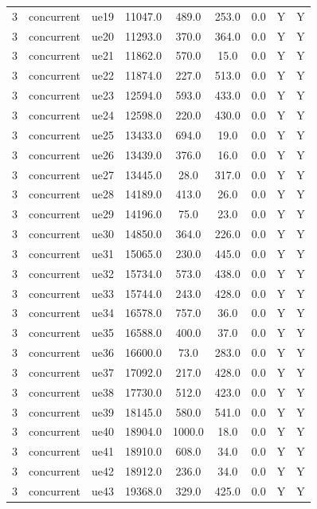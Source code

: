 \begin{table}[ht]
\begin{tabular}{|c|c|c|c|c|c|c|c|c|}
3 & concurrent & ue19 & 11047.0 & 489.0 & 253.0 & 0.0 & Y & Y \\
3 & concurrent & ue20 & 11293.0 & 370.0 & 364.0 & 0.0 & Y & Y \\
3 & concurrent & ue21 & 11862.0 & 570.0 & 15.0 & 0.0 & Y & Y \\
3 & concurrent & ue22 & 11874.0 & 227.0 & 513.0 & 0.0 & Y & Y \\
3 & concurrent & ue23 & 12594.0 & 593.0 & 433.0 & 0.0 & Y & Y \\
3 & concurrent & ue24 & 12598.0 & 220.0 & 430.0 & 0.0 & Y & Y \\
3 & concurrent & ue25 & 13433.0 & 694.0 & 19.0 & 0.0 & Y & Y \\
3 & concurrent & ue26 & 13439.0 & 376.0 & 16.0 & 0.0 & Y & Y \\
3 & concurrent & ue27 & 13445.0 & 28.0 & 317.0 & 0.0 & Y & Y \\
3 & concurrent & ue28 & 14189.0 & 413.0 & 26.0 & 0.0 & Y & Y \\
3 & concurrent & ue29 & 14196.0 & 75.0 & 23.0 & 0.0 & Y & Y \\
3 & concurrent & ue30 & 14850.0 & 364.0 & 226.0 & 0.0 & Y & Y \\
3 & concurrent & ue31 & 15065.0 & 230.0 & 445.0 & 0.0 & Y & Y \\
3 & concurrent & ue32 & 15734.0 & 573.0 & 438.0 & 0.0 & Y & Y \\
3 & concurrent & ue33 & 15744.0 & 243.0 & 428.0 & 0.0 & Y & Y \\
3 & concurrent & ue34 & 16578.0 & 757.0 & 36.0 & 0.0 & Y & Y \\
3 & concurrent & ue35 & 16588.0 & 400.0 & 37.0 & 0.0 & Y & Y \\
3 & concurrent & ue36 & 16600.0 & 73.0 & 283.0 & 0.0 & Y & Y \\
3 & concurrent & ue37 & 17092.0 & 217.0 & 428.0 & 0.0 & Y & Y \\
3 & concurrent & ue38 & 17730.0 & 512.0 & 423.0 & 0.0 & Y & Y \\
3 & concurrent & ue39 & 18145.0 & 580.0 & 541.0 & 0.0 & Y & Y \\
3 & concurrent & ue40 & 18904.0 & 1000.0 & 18.0 & 0.0 & Y & Y \\
3 & concurrent & ue41 & 18910.0 & 608.0 & 34.0 & 0.0 & Y & Y \\
3 & concurrent & ue42 & 18912.0 & 236.0 & 34.0 & 0.0 & Y & Y \\
3 & concurrent & ue43 & 19368.0 & 329.0 & 425.0 & 0.0 & Y & Y \\

\end{tabular}
\end{table}
